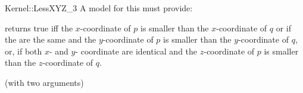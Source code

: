 \begin{ccRefFunctionObjectConcept}{Kernel::LessXYZ_3}
A model for this must provide:


{returns true iff the $x$-coordinate of $p$ is smaller than the
$x$-coordinate of $q$ or if the are the same and 
the $y$-coordinate of $p$ is smaller than the $y$-coordinate of $q$, or,
if both $x$- and $y$- coordinate are identical and
the $z$-coordinate of $p$ is smaller than the $z$-coordinate of $q$.}

\ccRefines
{} (with two arguments)

\ccSeeAlso
{}\\

\end{ccRefFunctionObjectConcept}
